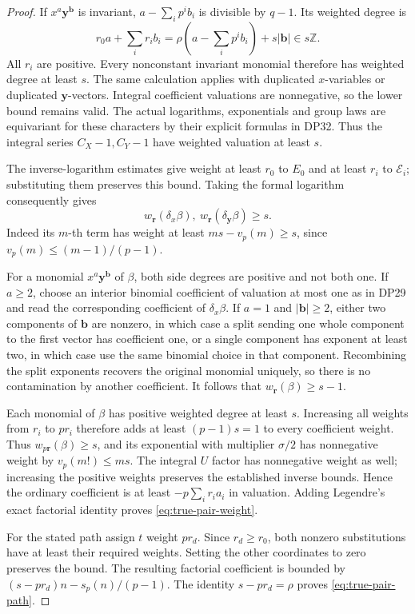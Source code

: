 \documentclass[11pt,a4paper]{article}
\theoremstyle{definition}\newtheorem{remark}[theorem]{Remark}
\newcommand{\Z}{\mathbb Z}\newcommand{\Q}{\mathbb Q}\newcommand{\F}{\mathbb F}
\begin{document}
\begin{proof}
If $x^a\mathbf y^{\mathbf b}$ is invariant, $a-\sum_i p^ib_i$ is divisible by $q-1$. Its weighted degree is
\[
 r_0a+\sum_i r_ib_i
 =\rho\left(a-\sum_i p^ib_i\right)+s|\mathbf b|\in s\Z.
\]
All $r_i$ are positive. Every nonconstant invariant monomial therefore has weighted degree at least $s$. The same calculation applies with duplicated $x$-variables or duplicated $\mathbf y$-vectors. Integral coefficient valuations are nonnegative, so the lower bound remains valid. The actual logarithms, exponentials and group laws are equivariant for these characters by their explicit formulas in DP32. Thus the integral series $C_X-1,C_Y-1$ have weighted valuation at least $s$.

The inverse-logarithm estimates give weight at least $r_0$ to $E_0$ and at least $r_i$ to $\mathcal E_i$; substituting them preserves this bound. Taking the formal logarithm consequently gives
\[
 w_{\mathbf r}(\delta_x\beta),\ w_{\mathbf r}(\delta_{\mathbf y}\beta)\ge s.
\]
Indeed its $m$-th term has weight at least $ms-v_p(m)\ge s$, since $v_p(m)\le(m-1)/(p-1)$.

For a monomial $x^a\mathbf y^{\mathbf b}$ of $\beta$, both side degrees are positive and not both one. If $a\ge2$, choose an interior binomial coefficient of valuation at most one as in DP29 and read the corresponding coefficient of $\delta_x\beta$. If $a=1$ and $|\mathbf b|\ge2$, either two components of $\mathbf b$ are nonzero, in which case a split sending one whole component to the first vector has coefficient one, or a single component has exponent at least two, in which case use the same binomial choice in that component. Recombining the split exponents recovers the original monomial uniquely, so there is no contamination by another coefficient. It follows that $w_{\mathbf r}(\beta)\ge s-1$.

Each monomial of $\beta$ has positive weighted degree at least $s$. Increasing all weights from $r_i$ to $pr_i$ therefore adds at least $(p-1)s=1$ to every coefficient weight. Thus $w_{p\mathbf r}(\beta)\ge s$, and its exponential with multiplier $\sigma/2$ has nonnegative weight by $v_p(m!)\le ms$. The integral $U$ factor has nonnegative weight as well; increasing the positive weights preserves the established inverse bounds. Hence the ordinary coefficient is at least $-p\sum_i r_ia_i$ in valuation. Adding Legendre's exact factorial identity proves \eqref{eq:true-pair-weight}.

For the stated path assign $t$ weight $pr_d$. Since $r_d\ge r_0$, both nonzero substitutions have at least their required weights. Setting the other coordinates to zero preserves the bound. The resulting factorial coefficient is bounded by $(s-pr_d)n-s_p(n)/(p-1)$. The identity $s-pr_d=\rho$ proves \eqref{eq:true-pair-path}.
\end{proof}
\end{document}
